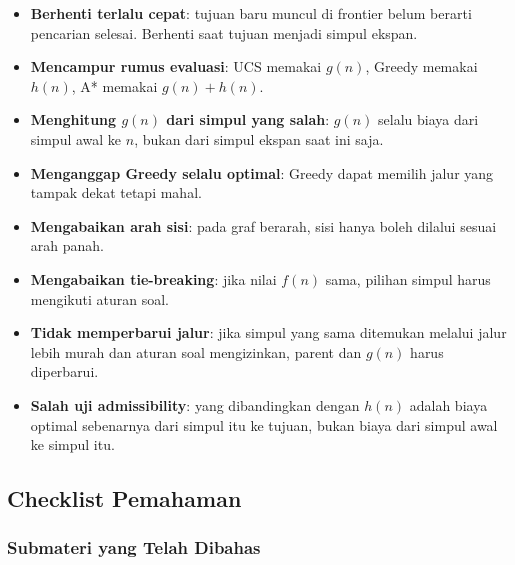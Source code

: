 \begin{itemize}
    \item \textbf{Berhenti terlalu cepat}: tujuan baru muncul di frontier belum berarti pencarian selesai. Berhenti saat tujuan menjadi simpul ekspan.
    \item \textbf{Mencampur rumus evaluasi}: UCS memakai $g(n)$, Greedy memakai $h(n)$, A* memakai $g(n)+h(n)$.
    \item \textbf{Menghitung $g(n)$ dari simpul yang salah}: $g(n)$ selalu biaya dari simpul awal ke $n$, bukan dari simpul ekspan saat ini saja.
    \item \textbf{Menganggap Greedy selalu optimal}: Greedy dapat memilih jalur yang tampak dekat tetapi mahal.
    \item \textbf{Mengabaikan arah sisi}: pada graf berarah, sisi hanya boleh dilalui sesuai arah panah.
    \item \textbf{Mengabaikan tie-breaking}: jika nilai $f(n)$ sama, pilihan simpul harus mengikuti aturan soal.
    \item \textbf{Tidak memperbarui jalur}: jika simpul yang sama ditemukan melalui jalur lebih murah dan aturan soal mengizinkan, parent dan $g(n)$ harus diperbarui.
    \item \textbf{Salah uji admissibility}: yang dibandingkan dengan $h(n)$ adalah biaya optimal sebenarnya dari simpul itu ke tujuan, bukan biaya dari simpul awal ke simpul itu.
\end{itemize}

\subsection{Checklist Pemahaman}

\subsubsection{Submateri yang Telah Dibahas}

